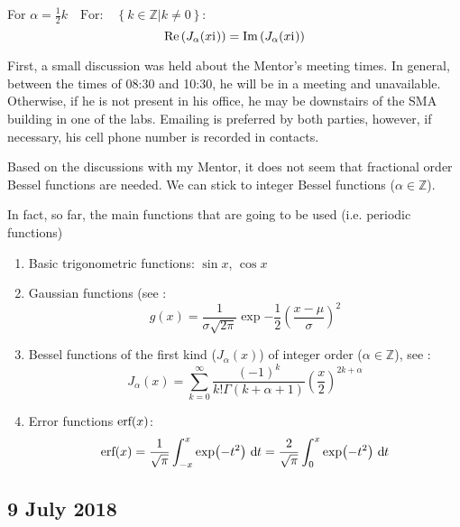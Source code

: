 \documentclass[twocolumn]{article}
\begin{document}
For $\alpha = \frac{1}{2}k \quad \text{For:} \quad \left\{ \left. k \in \mathbb{Z} \right| k \neq 0 \right\}$:
\begin{equation*}
	\text{Re} \left( J_\alpha (x \mathrm{i}\mkern1mu) \right) = \text{Im} \left( J_\alpha (x \mathrm{i}\mkern1mu) \right)
\end{equation*}

\begin{meetingnotes*}
	First, a small discussion was held about the Mentor's meeting times. In general, between the times of 08:30 and 10:30, he will be in a meeting and unavailable. Otherwise, if he is not present in his office, he may be downstairs of the SMA building in one of the labs. Emailing is preferred by both parties, however, if necessary, his cell phone number is recorded in contacts.

	Based on the discussions with my Mentor, it does not seem that fractional order Bessel functions are needed. We can stick to integer Bessel functions ($\alpha \in \mathbb{Z}$). 

	In fact, so far, the main functions that are going to be used (i.e. periodic functions)
	\begin{enumerate}
		\item Basic trigonometric functions: $\sin{x}$, $\cos{x}$
		\item Gaussian functions (see : 
			\begin{equation*}
				g(x) = \frac{1}{\sigma \sqrt{2 \pi}} \exp{ -\frac{1}{2} \left(\frac{x-\mu}{\sigma}\right)^2 }
			\end{equation*}
		\item Bessel functions of the first kind ($J_\alpha(x)$) of integer order ($\alpha \in \mathbb{Z}$), see :
			\begin{equation*}
				J_{\alpha}(x) = \sum_{k=0}^{\infty} \frac{\left(-1\right)^{k}}{k! \Gamma(k+\alpha+1)} \left( \frac{x}{2} \right)^{2k + \alpha}
			\end{equation*}
		\item Error functions $\text{erf} \! \left( x \right)$:
			\begin{equation*}
				\erf{x} = \frac{1}{\sqrt{\pi}} \int_{-x}^{x} \exp{-t^2} \diff{t} = \frac{2}{\sqrt{\pi}} \int_{0}^{x} \exp{-t^2} \diff{t}
				\label{eq:error_function}
			\end{equation*}
	\end{enumerate}
\end{meetingnotes*}


\subsection{9 July 2018}
\label{subsec:9_July_2018}
\end{document}
